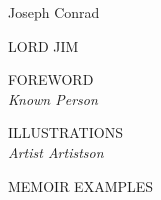 \cleardoublepage
\thispagestyle{empty}
\begin{center}
	\vspace*{5\onelineskip}
	
	{\HUGE Joseph Conrad \par}
	\vspace{5pt}
	\hrulefill\par
	{\HUGE LORD JIM \par}
	
	
	\vspace*{3\onelineskip}
		
	{\normalsize FOREWORD}\\[0.4\onelineskip]
	{\LARGE\itshape Known Person}
	
	\vspace*{1\onelineskip}
	
	{\normalsize ILLUSTRATIONS}\\[0.4\onelineskip]
	{\LARGE\itshape Artist Artistson}
	

	
	\vspace{\fill}
	
	\hrulefill\par
	
	\vspace{0.5\onelineskip}
	
	{\LARGE MEMOIR EXAMPLES}	
	
\end{center}


